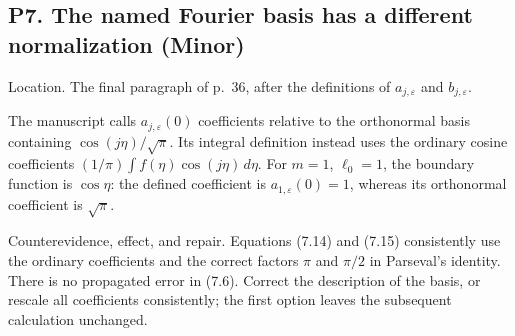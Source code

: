 \documentclass[10pt]{article}
\begin{document}
\subsection*{P7. The named Fourier basis has a different normalization (Minor)}
Location. The final paragraph of p. 36, after the definitions of \(a_{j,\varepsilon}\) and \(b_{j,\varepsilon}\).\par
The manuscript calls \(a_{j,\varepsilon}(0)\) coefficients relative to the orthonormal basis containing \(\cos(j\eta)/\sqrt\pi\). Its integral definition instead uses the ordinary cosine coefficients \((1/\pi)\int f(\eta)\cos(j\eta)\,d\eta\). For \(m=1\), \(\ell_0=1\), the boundary function is \(\cos\eta\): the defined coefficient is \(a_{1,\varepsilon}(0)=1\), whereas its orthonormal coefficient is \(\sqrt\pi\).\par
Counterevidence, effect, and repair. Equations (7.14) and (7.15) consistently use the ordinary coefficients and the correct factors \(\pi\) and \(\pi/2\) in Parseval’s identity. There is no propagated error in (7.6). Correct the description of the basis, or rescale all coefficients consistently; the first option leaves the subsequent calculation unchanged.\par
\end{document}
